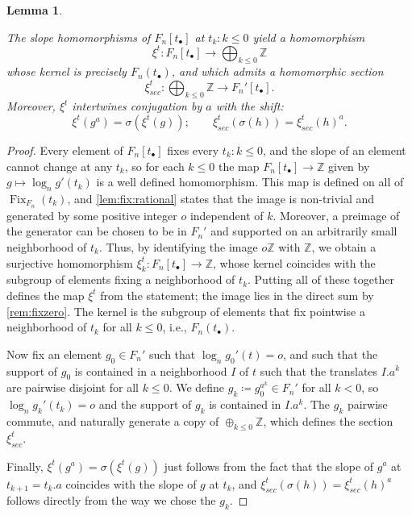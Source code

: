 \documentclass[reqno,12pt]{amsart}\setcounter{tocdepth}{1}
\newtheorem{lemma}[theorem]{Lemma}
\theoremstyle{definition}
\newcommand{\Z}{\mathbb{Z}}
\DeclareMathOperator{\Fix}{Fix}
\numberwithin{equation}{section}
\begin{document}
\begin{lemma}
\label{lem:rational:slopes}

The slope homomorphisms of $F_n[t_\bullet]$ at $t_k : k \leq 0$ yield a homomorphism
\[\xi^t \colon F_n[t_\bullet] \to \bigoplus_{k \leq 0} \Z\] 
whose kernel is precisely $F_n(t_\bullet)$, and which admits a homomorphic section
\[\xi_{sec}^t \colon \bigoplus_{k \leq 0} \Z \to F_n'[t_\bullet].\]
Moreover, $\xi^t$ intertwines conjugation by $a$ with the shift:
\[\xi^t(g^a) = \sigma(\xi^t(g)); \qquad \xi^t_{sec}(\sigma(h)) = \xi^t_{sec}(h)^a.\]
\end{lemma}

\begin{proof}
Every element of $F_n[t_\bullet]$ fixes every $t_k : k \leq 0$, and the slope of an element cannot change at any $t_k$, so for each $k\le 0$ the map $F_n[t_\bullet] \to \Z$ given by $g\mapsto \log_n g'(t_k)$ is a well defined homomorphism. This map is defined on all of $\Fix_{F_n}(t_k)$, and \cref{lem:fix:rational} states that the image is non-trivial and generated by some positive integer $o$ independent of $k$. Moreover, a preimage of the generator can be chosen to be in $F_n'$ and supported on an arbitrarily small neighborhood of $t_k$. Thus, by identifying the image $o \Z$ with $\Z$, we obtain a surjective homomorphism $\xi^t_k \colon F_n[t_\bullet] \to \Z$, whose kernel coincides with the subgroup of elements fixing a neighborhood of $t_k$. Putting all of these together defines the map $\xi^t$ from the statement; the image lies in the direct sum by \cref{rem:fixzero}. The kernel is the subgroup of elements that fix pointwise a neighborhood of $t_k$ for all $k \leq 0$, i.e., $F_n(t_\bullet)$.

Now fix an element $g_0 \in F_n'$ such that $\log_n g_0'(t) = o$, and such that the support of $g_0$ is contained in a neighborhood $I$ of $t$ such that the translates $I.a^k$ are pairwise disjoint for all $k\le 0$. We define $g_k \coloneqq g_0^{a^k} \in F_n'$ for all $k < 0$, so $\log_n g_k'(t_k) = o$ and the support of $g_k$ is contained in $I.a^k$. The $g_k$ pairwise commute, and naturally generate a copy of $\oplus_{k \leq 0} \Z$, which defines the section $\xi^t_{sec}$. 

Finally, $\xi^t(g^a) = \sigma(\xi^t(g))$ just follows from the fact that the slope of $g^a$ at $t_{k+1} = t_k.a$ coincides with the slope of $g$ at $t_k$, and $\xi^t_{sec}(\sigma(h)) = \xi^t_{sec}(h)^a$ follows directly from the way we chose the $g_k$. 
\end{proof}
\end{document}
